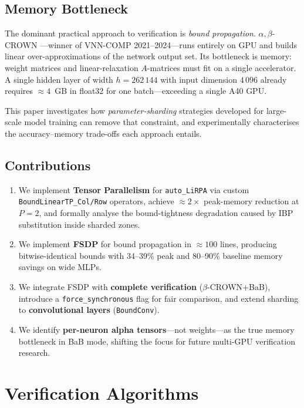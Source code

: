 \documentclass[11pt]{article}
\begin{document}
\subsection{Memory Bottleneck}

The dominant practical approach to verification is \emph{bound propagation}.
$\alpha,\beta$-CROWN \citep{AlphaBetaCrownVNNCOMP23}---winner of VNN-COMP
2021--2024---runs entirely on GPU and builds linear over-approximations of the
network output set. Its bottleneck is memory: weight matrices and
linear-relaxation $A$-matrices must fit on a single accelerator. A single
hidden layer of width $h{=}262\,144$ with input dimension $4\,096$ already
requires ${\approx}4$~GB in float32 for one batch---exceeding a single A40 GPU.

This paper investigates how \emph{parameter-sharding} strategies developed for
large-scale model training can remove that constraint, and experimentally
characterises the accuracy--memory trade-offs each approach entails.

\subsection*{Contributions}
\begin{enumerate}
\item We implement \textbf{Tensor Parallelism} for \texttt{auto\_LiRPA} via
  custom \texttt{BoundLinearTP\_Col/Row} operators, achieve
  ${\approx}2\times$ peak-memory reduction at $P{=}2$, and formally analyse
  the bound-tightness degradation caused by IBP substitution inside sharded
  zones.
\item We implement \textbf{FSDP} for bound propagation in ${\approx}100$ lines,
  producing bitwise-identical bounds with 34--39\% peak and 80--90\% baseline
  memory savings on wide MLPs.
\item We integrate FSDP with \textbf{complete verification} ($\beta$-CROWN+BaB),
  introduce a \texttt{force\_synchronous} flag for fair comparison, and extend
  sharding to \textbf{convolutional layers} (\texttt{BoundConv}).
\item We identify \textbf{per-neuron alpha tensors}---not weights---as the true
  memory bottleneck in BaB mode, shifting the focus for future multi-GPU
  verification research.
\end{enumerate}

\section{Verification Algorithms}
\label{sec:verifiers}
\end{document}
